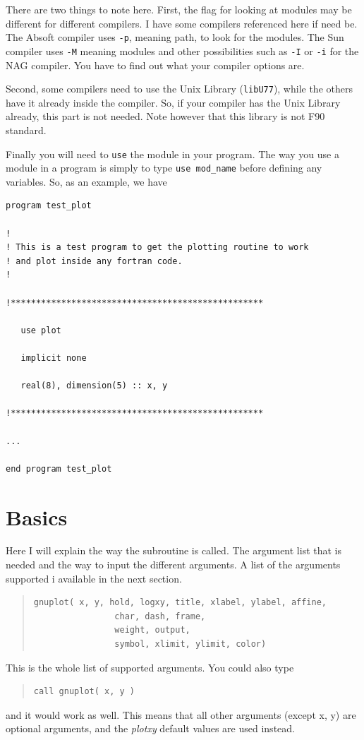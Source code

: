 \documentclass{article}
\begin{document}
There are two things to note here. First, the flag for looking at modules may be different for different compilers. I have some compilers referenced here if need be. The Absoft compiler uses \texttt{-p}, meaning path, to look for the modules. The Sun compiler uses \texttt{-M} meaning modules and other possibilities such as \texttt{-I} or \texttt{-i} for the NAG compiler. You have to find out what your compiler options are.

Second, some compilers need to use the Unix Library (\texttt{libU77}), while the others have it already inside the compiler. So, if your compiler has the Unix Library already, this part is not needed. Note however that this library is not F90 standard. 

Finally you will need to \texttt{use} the module in your program. The way you use a module in a program is simply to type \texttt{use mod\_name} before defining any variables. So, as an example, we have
\begin{verbatim}
program test_plot

!
! This is a test program to get the plotting routine to work
! and plot inside any fortran code.
!

!**************************************************

   use plot

   implicit none

   real(8), dimension(5) :: x, y

!**************************************************

...

end program test_plot
\end{verbatim}


\section{Basics}
Here I will explain the way the subroutine is called. The argument list that is needed and the way to input the different arguments. A list of the arguments supported i available in the next section. 
\begin{quote}
\begin{verbatim}
gnuplot( x, y, hold, logxy, title, xlabel, ylabel, affine,   
   				char, dash, frame,   
   				weight, output,      
   				symbol, xlimit, ylimit, color)
\end{verbatim}
\end{quote}
This is the whole list of supported arguments. You could also type
\begin{quote}
\begin{verbatim}
call gnuplot( x, y )
\end{verbatim}
\end{quote}
and it would work as well. This means that all other arguments (except x, y) are optional arguments, and the {\it plotxy} default values are used instead. 
\end{document}
